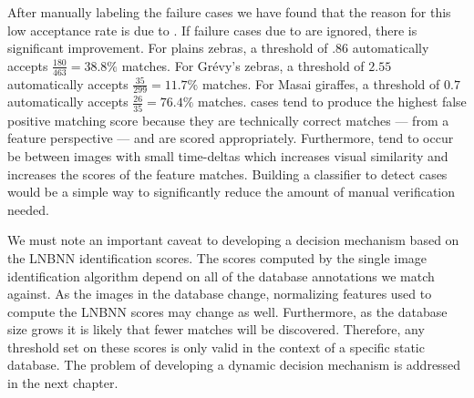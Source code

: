         After manually labeling the failure cases we have found that the reason for this low acceptance rate is
          due to \photobombings{}.
        If failure cases due to \photobombings{} are ignored, there is significant improvement.
        For plains zebras, a threshold of $.86$ automatically accepts $\frac{180}{463} = 38.8\percent$
          \groundtrue{} matches.
        For Grévy's zebras, a threshold of $2.55$ automatically accepts $\frac{35}{299} = 11.7\percent$
          \groundtrue{} matches.
        For Masai giraffes, a threshold of $0.7$ automatically accepts $\frac{26}{35} = 76.4\percent$
          \groundtrue{} matches.
        \Photobombing{} cases tend to produce the highest false positive matching score because they are
          technically correct matches --- from a feature perspective --- and are scored appropriately.
        Furthermore, \photobombings{} tend to occur be between images with small time-deltas which increases
          visual similarity and increases the scores of the feature matches.
        Building a classifier to detect \photobomb{} cases would be a simple way to significantly reduce the
          amount of manual verification needed.

        We must note an important caveat to developing a decision mechanism based on the LNBNN identification
          scores.
        The scores computed by the single image identification algorithm depend on all of the database
          annotations we match against.
        As the images in the database change, normalizing features used to compute the LNBNN scores may change as
          well.
        Furthermore, as the database size grows it is likely that fewer matches will be discovered.
        Therefore, any threshold set on these scores is only valid in the context of a specific static database.
        The problem of developing a dynamic decision mechanism is addressed in the next chapter.

